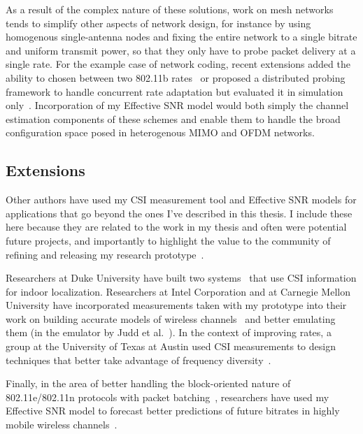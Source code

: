 As a result of the complex nature of these solutions, work on mesh networks tends to simplify other aspects of network design, for instance by using homogenous single-antenna nodes and fixing the entire network to a single bitrate and uniform transmit power, so that they only have to probe packet delivery at a single rate. For the example case of network coding, recent extensions added the ability to chosen between two 802.11b rates~\cite{Ni_CodingRates} or proposed a distributed probing framework to handle concurrent rate adaptation but evaluated it in simulation only~\cite{Kim_NetworkCoding}. Incorporation of my Effective SNR model would both simply the channel estimation components of these schemes and enable them to handle the broad configuration space posed in heterogenous MIMO and OFDM networks.

\subsection{Extensions}
Other authors have used my CSI measurement tool and Effective SNR models for applications that go beyond the ones I've described in this thesis. I include these here because they are related to the work in my thesis and often were potential future projects, and importantly to highlight the value to the community of refining and releasing my research prototype~\cite{Halperin_csitool}.

Researchers at Duke University have built two systems~\cite{Sen_PinLoc,Sen_SpinLoc} that use CSI information for indoor localization. Researchers at Intel Corporation and at Carnegie Mellon University have incorporated measurements taken with my prototype into their work on building accurate models of wireless channels~\cite{Perahia_Doppler} and better emulating them (in the emulator by Judd et al.~\cite{CMU_Emulator,Judd_Emulator}). In the context of improving rates, a group at the University of Texas at Austin used CSI measurements to design techniques that better take advantage of frequency diversity~\cite{Bhartia_FreqDiv}.

Finally, in the area of better handling the block-oriented nature of 802.11e/802.11n protocols with packet batching~\cite{Tie_BlockRate}, researchers have used my Effective SNR model to forecast better predictions of future bitrates in highly mobile wireless channels~\cite{Sen_PhyRate}.




\ifx\mainfile\undefined

\fi
